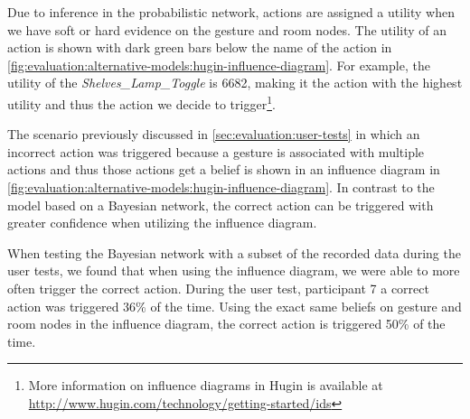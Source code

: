 Due to inference in the probabilistic network, actions are assigned a utility when we have soft or hard evidence on the gesture and room nodes. The utility of an action is shown with dark green bars below the name of the action in \cref{fig:evaluation:alternative-models:hugin-influence-diagram}. For example, the utility of the \emph{Shelves\_Lamp\_Toggle} is 6682, making it the action with the highest utility and thus the action we decide to trigger\footnote{More information on influence diagrams in Hugin is available at \url{http://www.hugin.com/technology/getting-started/ids}}.

The scenario previously discussed in \cref{sec:evaluation:user-tests} in which an incorrect action was triggered because a gesture is associated with multiple actions and thus those actions get a belief is shown in an influence diagram in \cref{fig:evaluation:alternative-models:hugin-influence-diagram}. In contrast to the model based on a Bayesian network, the correct action can be triggered with greater confidence when utilizing the influence diagram.

When testing the Bayesian network with a subset of the recorded data during the user tests, we found that when using the influence diagram, we were able to more often trigger the correct action. During the user test, participant 7 a correct action was triggered 36\% of the time. Using the exact same beliefs on gesture and room nodes in the influence diagram, the correct action is triggered 50\% of the time.


